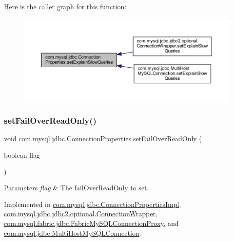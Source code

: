Here is the caller graph for this function\+:\nopagebreak
\begin{figure}[H]
\begin{center}
\leavevmode
\includegraphics[width=350pt]{interfacecom_1_1mysql_1_1jdbc_1_1_connection_properties_a9857fb61eea34e28c3bbff76b6ac5ca9_icgraph}
\end{center}
\end{figure}
\mbox{\label{interfacecom_1_1mysql_1_1jdbc_1_1_connection_properties_acc1561f34ff6aaa02a3a6c0e6184644f}} 
\subsubsection{\texorpdfstring{set\+Fail\+Over\+Read\+Only()}{setFailOverReadOnly()}}
{\footnotesize\ttfamily void com.\+mysql.\+jdbc.\+Connection\+Properties.\+set\+Fail\+Over\+Read\+Only (\begin{DoxyParamCaption}\item[{boolean}]{flag }\end{DoxyParamCaption})}


\begin{DoxyParams}{Parameters}
{\em flag} & The fail\+Over\+Read\+Only to set. \\
\hline
\end{DoxyParams}


Implemented in \mbox{\hyperlink{classcom_1_1mysql_1_1jdbc_1_1_connection_properties_impl_ac6e1b879525591a11a40c18e1ec96ba4}{com.\+mysql.\+jdbc.\+Connection\+Properties\+Impl}}, \mbox{\hyperlink{classcom_1_1mysql_1_1jdbc_1_1jdbc2_1_1optional_1_1_connection_wrapper_a23b3e7be6b29af8786a6641fec4196aa}{com.\+mysql.\+jdbc.\+jdbc2.\+optional.\+Connection\+Wrapper}}, \mbox{\hyperlink{classcom_1_1mysql_1_1fabric_1_1jdbc_1_1_fabric_my_s_q_l_connection_proxy_ace366896a0499c27849b541a7f5e7162}{com.\+mysql.\+fabric.\+jdbc.\+Fabric\+My\+S\+Q\+L\+Connection\+Proxy}}, and \mbox{\hyperlink{classcom_1_1mysql_1_1jdbc_1_1_multi_host_my_s_q_l_connection_a17dcc1cedd18c886c23b8afd43a22cfe}{com.\+mysql.\+jdbc.\+Multi\+Host\+My\+S\+Q\+L\+Connection}}.

